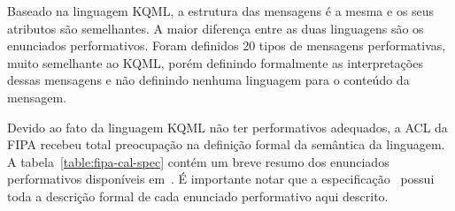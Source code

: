 Baseado na linguagem KQML, a estrutura das mensagens é a mesma e os seus atributos são semelhantes. A maior diferença entre as duas linguagens são os enunciados performativos. Foram definidos 20 tipos de mensagens performativas, muito semelhante ao KQML, porém definindo formalmente as interpretações dessas mensagens e não definindo nenhuma linguagem para o conteúdo da mensagem.

Devido ao fato da linguagem KQML não ter performativos adequados, a ACL da FIPA recebeu total preocupação na definição formal da semântica da linguagem. A tabela~\ref{table:fipa-cal-spec} contém um breve resumo dos enunciados performativos disponíveis em~\cite{fipa-cal-spec}. É importante notar que a especificação~\cite{fipa-cal-spec} possui toda a descrição formal de cada enunciado performativo aqui descrito.

